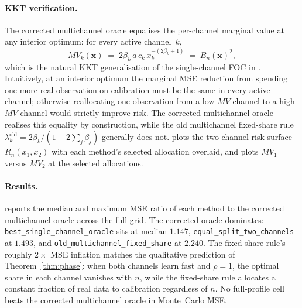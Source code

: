 \paragraph{KKT verification.} The corrected multichannel oracle equalises the per-channel marginal value at any interior optimum: for every active channel~$k$,
\[
MV_k(\mathbf{x}) \;=\; 2\beta_k\, a\, c_k\, x_k^{-(2\beta_k + 1)}
\;=\; B_n(\mathbf{x})^2,
\]
which is the natural KKT generalisation of the single-channel FOC in . Intuitively, at an interior optimum the marginal MSE reduction from spending one more real observation on calibration must be the same in every active channel; otherwise reallocating one observation from a low-$MV$ channel to a high-$MV$ channel would strictly improve risk. The corrected multichannel oracle realises this equality by construction, while the old multichannel fixed-share rule $\lambda_k^{\mathrm{old}} = 2\beta_k / (1 + 2\sum_j \beta_j)$ generally does not.  plots the two-channel risk surface $R_n(x_1, x_2)$ with each method's selected allocation overlaid, and  plots $MV_1$ versus $MV_2$ at the selected allocations.

\paragraph{Results.}  reports the median and maximum MSE ratio of each method to the corrected multichannel oracle across the full grid. The corrected oracle dominates: \texttt{best\_single\_channel\_oracle} sits at median $1.147$, \texttt{equal\_split\_two\_channels} at $1.493$, and \texttt{old\_multichannel\_fixed\_share} at $2.240$. The fixed-share rule's roughly $2\times$ MSE inflation matches the qualitative prediction of Theorem~\ref{thm:phase}: when both channels learn fast and $\rho = 1$, the optimal share in each channel vanishes with $n$, while the fixed-share rule allocates a constant fraction of real data to calibration regardless of $n$. No full-profile cell beats the corrected multichannel oracle in Monte~Carlo MSE.

